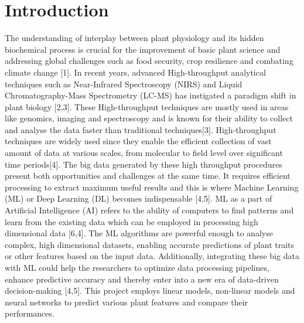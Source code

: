 \documentclass[12pt,a4paper]{article}
\begin{document}

\chapter{Introduction}

The understanding of interplay between plant physiology and its hidden biochemical process is crucial for the improvement of basic plant science and addressing global challenges such as food security, crop resilience and combating climate change [1]. 
In recent years, advanced High-throughput analytical techniques such as Near-Infrared Spectroscopy (NIRS) and Liquid Chromatography-Mass Spectrometry (LC-MS) has instigated a paradigm shift in plant biology [2,3].
These High-throughput techniques are mostly used in areas like genomics, imaging and spectroscopy and is known for their ability to collect and analyse the data faster than traditional techniques[3].
High-throughput techniques are widely used since they enable the efficient collection of vast amount of data at various scales, from molecular to field level over significant time periods[4].
The big data generated by these high throughput procedures present both opportunities and challenges at the same time. It requires efficient processing to extract maximum useful results and this is where Machine Learning (ML) or Deep Learning (DL) becomes indispensable [4,5].
ML as a part of Artificial Intelligence (AI) refers to the ability of computers to find patterns and learn from the existing data which can be employed in processing high dimensional data [6,4]. The ML algorithms are powerful enough to analyse complex, high dimensional datasets, 
enabling accurate predictions of plant traits or other features based on the input data. Additionally, integrating these big data with ML could help the researchers to optimize data processing pipelines, enhance predictive accuracy and thereby enter into a new era of data-driven decision-making [4,5]. This project employs linear models, non-linear models and neural networks to predict various plant features and compare their performances. \\
\end{document}
